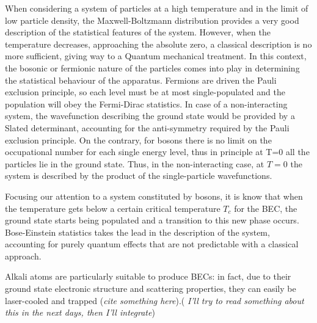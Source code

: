 When considering a system of particles at a high temperature and in the limit of low particle density, the Maxwell-Boltzmann distribution provides a very good description of the statistical features of the system. However, when the temperature decreases, approaching the absolute zero, a classical description is no more sufficient, giving way to a Quantum mechanical treatment. In this context, the bosonic or fermionic nature of the particles comes into play in determining the statistical behaviour of the apparatus. Fermions are driven the Pauli exclusion principle, so each level must be at most single-populated and the population will obey the Fermi-Dirac statistics. In case of a non-interacting system, the wavefunction describing the ground state would be provided by a Slated determinant, accounting for the anti-symmetry required by the Pauli exclusion principle. On the contrary, for bosons there is no limit on the occupational number for each single energy level, thus in principle at T=0 all the particles lie in the ground state. Thus, in the non-interacting case, at $T=0$ the system is described by the product of the single-particle wavefunctions.

Focusing our attention to a system constituted by bosons, it is know that when the temperature gets below a certain critical temperature $T_c$ for the BEC, the ground state starts being populated and a transition to this new phase occurs. Bose-Einstein statistics takes the lead in the description of the system, accounting for purely quantum effects that are not predictable with a classical approach.

Alkali atoms are particularly suitable to produce BECs: in fact, due to their ground state electronic structure and scattering properties, they can easily be laser-cooled and trapped (\textit{cite something here}).( \textit{I'll try to read something about this in the next days, then I'll integrate})\\


